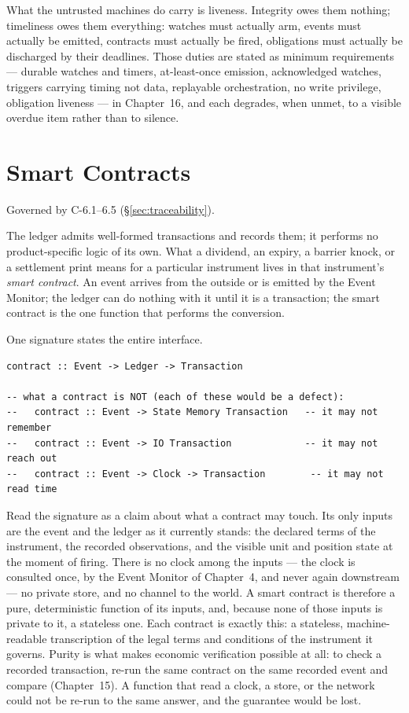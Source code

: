 \documentclass[11pt,a4paper]{article}
\begin{document}
What the untrusted machines do carry is liveness. Integrity owes them nothing;
timeliness owes them everything: watches must actually arm, events must
actually be emitted, contracts must actually be fired, obligations must
actually be discharged by their deadlines. Those duties are stated as minimum
requirements --- durable watches and timers, at-least-once emission,
acknowledged watches, triggers carrying timing not data, replayable
orchestration, no write privilege, obligation liveness --- in Chapter~16, and
each degrades, when unmet, to a visible overdue item rather than to silence.

\section{Smart Contracts}\label{ch:contracts}

Governed by C-6.1--6.5 (\S\ref{sec:traceability}).

The ledger admits well-formed transactions and records them; it performs no
product-specific logic of its own. What a dividend, an expiry, a barrier knock,
or a settlement print means for a particular instrument lives in that
instrument's \emph{smart contract}. An event arrives from the outside or is
emitted by the Event Monitor; the ledger can do nothing with it until it is a
transaction; the smart contract is the one function that performs the
conversion.

One signature states the entire interface.

\begin{lstlisting}
contract :: Event -> Ledger -> Transaction

-- what a contract is NOT (each of these would be a defect):
--   contract :: Event -> State Memory Transaction   -- it may not remember
--   contract :: Event -> IO Transaction             -- it may not reach out
--   contract :: Event -> Clock -> Transaction        -- it may not read time
\end{lstlisting}

Read the signature as a claim about what a contract may touch. Its only inputs
are the event and the ledger as it currently stands: the declared terms of the
instrument, the recorded observations, and the visible unit and position state
at the moment of firing. There is no clock among the inputs --- the clock is
consulted once, by the Event Monitor of Chapter~4, and never again downstream
--- no private store, and no channel to the world. A smart contract is
therefore a pure, deterministic function of its inputs, and, because none of
those inputs is private to it, a stateless one. Each contract is exactly this: a
stateless, machine-readable transcription of the legal terms and conditions of
the instrument it governs. Purity is what makes economic verification possible
at all: to check a recorded transaction, re-run the same contract on the same
recorded event and compare (Chapter~15). A function that read a clock, a store,
or the network could not be re-run to the same answer, and the guarantee would
be lost.
\end{document}
